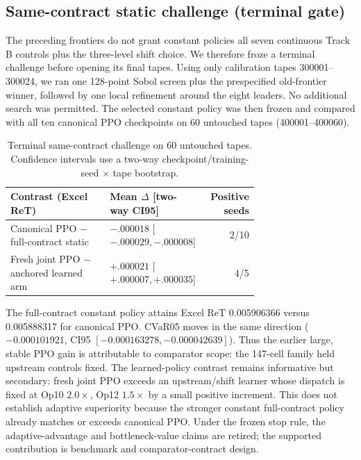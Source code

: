 \hypertarget{44b-same-contract-challenge}{%
\subsection{Same-contract static challenge (terminal gate)}\label{44b-same-contract-challenge}}

The preceding frontiers do not grant constant policies all seven continuous
Track B controls plus the three-level shift choice. We therefore froze a
terminal challenge before opening its final tapes. Using only calibration
tapes 300001--300024, we ran one 128-point Sobol screen plus the prespecified
old-frontier winner, followed by one local refinement around the eight
leaders. No additional search was permitted. The selected constant policy
was then frozen and compared with all ten canonical PPO checkpoints on 60
untouched tapes (400001--400060).

\begin{table}[htbp]
\centering
\caption{Terminal same-contract challenge on 60 untouched tapes. Confidence intervals use a two-way checkpoint/training-seed $\times$ tape bootstrap.}
\label{tab:same_contract_challenge}
\small
\begin{tabular}{@{}p{0.40\linewidth}p{0.31\linewidth}r@{}}
\toprule
Contrast (Excel ReT) & Mean $\Delta$ [two-way CI95] & Positive seeds \\
\midrule
Canonical PPO $-$ full-contract static & $-.000018$ [$-.000029,-.000008$] & 2/10 \\
Fresh joint PPO $-$ anchored learned arm & $+.000021$ [$+.000007,+.000035$] & 4/5 \\
\bottomrule
\end{tabular}
\end{table}

The full-contract constant policy attains Excel ReT 0.005906366 versus
0.005888317 for canonical PPO. CVaR05 moves in the same direction
($-0.000101921$, CI95 $[-0.000163278,-0.000042639]$). Thus the earlier large,
stable PPO gain is attributable to comparator scope: the 147-cell family
held upstream controls fixed. The learned-policy contrast remains informative
but secondary: fresh joint PPO exceeds an upstream/shift learner whose
dispatch is fixed at Op10 $2.0\times$, Op12 $1.5\times$ by a small positive
increment. This does not establish adaptive superiority because the stronger
constant full-contract policy already matches or exceeds canonical PPO. Under
the frozen stop rule, the adaptive-advantage and bottleneck-value claims are
retired; the supported contribution is benchmark and comparator-contract
design.

